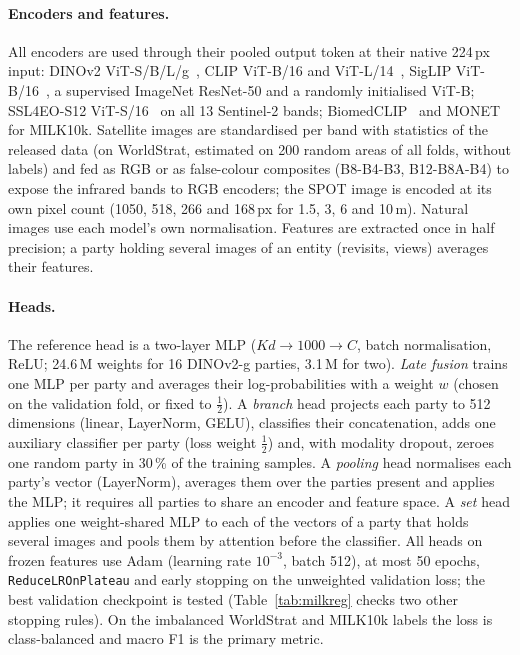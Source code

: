 \paragraph{Encoders and features.}
All encoders are used through their pooled output token at their native 224\,px input: DINOv2 ViT-S/B/L/g~\cite{oquab2024dinov2}, CLIP ViT-B/16 and ViT-L/14~\cite{radford2021clip}, SigLIP ViT-B/16~\cite{zhai2023siglip}, a supervised ImageNet ResNet-50 and a randomly initialised ViT-B; SSL4EO-S12 ViT-S/16~\cite{wang2023ssl4eo} on all 13 Sentinel-2 bands; BiomedCLIP~\cite{zhang2023biomedclip} and MONET~\cite{kim2024monet} for MILK10k. Satellite images are standardised per band with statistics of the released data (on WorldStrat, estimated on 200 random areas of all folds, without labels) and fed as RGB or as false-colour composites (B8-B4-B3, B12-B8A-B4) to expose the infrared bands to RGB encoders; the SPOT image is encoded at its own pixel count (1050, 518, 266 and 168\,px for 1.5, 3, 6 and 10\,m). Natural images use each model's own normalisation. Features are extracted once in half precision; a party holding several images of an entity (revisits, views) averages their features.

\paragraph{Heads.}
The reference head is a two-layer MLP ($Kd\to1000\to C$, batch normalisation, ReLU; 24.6\,M weights for 16 DINOv2-g parties, 3.1\,M for two). \emph{Late fusion} trains one MLP per party and averages their log-probabilities with a weight $w$ (chosen on the validation fold, or fixed to $\tfrac12$). A \emph{branch} head projects each party to 512 dimensions (linear, LayerNorm, GELU), classifies their concatenation, adds one auxiliary classifier per party (loss weight $\tfrac12$) and, with modality dropout, zeroes one random party in 30\,\% of the training samples. A \emph{pooling} head normalises each party's vector (LayerNorm), averages them over the parties present and applies the MLP; it requires all parties to share an encoder and feature space. A \emph{set} head applies one weight-shared MLP to each of the vectors of a party that holds several images and pools them by attention before the classifier. All heads on frozen features use Adam (learning rate $10^{-3}$, batch 512), at most 50 epochs, \texttt{ReduceLROnPlateau} and early stopping on the unweighted validation loss; the best validation checkpoint is tested (Table~\ref{tab:milkreg} checks two other stopping rules). On the imbalanced WorldStrat and MILK10k labels the loss is class-balanced and macro F1 is the primary metric.

